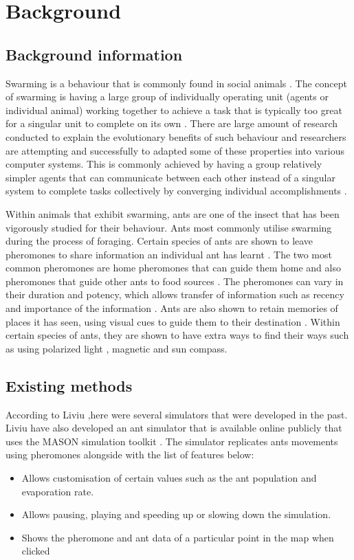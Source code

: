 \documentclass[a4paper, oneside, 11pt]{report}
\begin{document}
\chapter{Background}
\label{chap:background}
\section{Background information}
Swarming is a behaviour that is commonly found in social animals \citep{Swarm_Animals}. The concept of swarming is having a large group of individually operating unit (agents or individual animal) working together to achieve a task that is typically too great for a singular unit to complete on its own \citep{Swarm_Explanation}. There are large amount of research conducted to explain the evolutionary benefits of such behaviour and researchers are attempting and successfully to adapted some of these properties into various computer systems. This is commonly achieved by having a group relatively simpler agents that can communicate between each other instead of a singular system to complete tasks collectively by converging individual accomplishments \citep{Swarm_Properties}.

Within animals that exhibit swarming, ants are one of the insect that has been vigorously studied for their behaviour. Ants most commonly utilise swarming during the process of foraging. Certain species of ants are shown to leave pheromones to share information an individual ant has learnt \citep{Ant_Pheromones}. The two most common pheromones are home pheromones that can guide them home and also pheromones that guide other ants to food sources \citep{Ant_Pheromones}. The pheromones can vary in their duration and potency, which allows transfer of information such as recency and importance of the information \citep{Ant_Pheromones}. Ants are also shown to retain memories of places it has seen, using visual cues to guide them to their destination \citep{Ant_Memory_1} \cite{Ant_Memory_2} \cite{Ant_Memory_3}. Within certain species of ants, they are shown to have extra ways to find their ways such as using polarized light \citep{Ant_Navigation_Light}, magnetic \citep{Ant_Navigation_Magnetic_1} \cite{Ant_Navigation_Magnetic_2} and sun \citep{Ant_Navigation_Wind} compass.


\section{Existing methods}
According to Liviu \citep{Ant_Simulator},here were several simulators that were developed in the past. Liviu have also developed an ant simulator that is available online publicly that uses the MASON simulation toolkit \citep{Mason}. The simulator replicates ants movements using pheromones alongside with the list of features below:
\begin{itemize}
	\item Allows customisation of certain values such as the ant population and evaporation rate.
	\item Allows pausing, playing and speeding up or slowing down the simulation.
	\item Shows the pheromone and ant data of a particular point in the map when clicked
\end{itemize}
\end{document}
